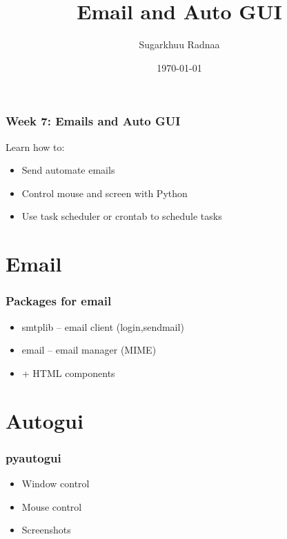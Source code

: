 \documentclass{beamer}
\title[Introduction to Python]{Email and Auto GUI}
\author{Sugarkhuu Radnaa}
\institute[]
{
Py4Econ in Ulaanbaatar \\ 
\medskip
\textit{py4econ@gmail.com} 
}
\date{\today}  %
\begin{document}
\begin{frame}
\titlepage %
\end{frame}

\begin{frame}
    \frametitle{Week 7: Emails and Auto GUI}
    Learn how to:
    \begin{itemize}
        \item Send automate emails
        \item Control mouse and screen with Python
        \item Use task scheduler or crontab to schedule tasks
    \end{itemize}
\end{frame}

\section{Email} 

\begin{frame}
    \frametitle{Packages for email}
            \begin{itemize}
                \item smtplib – email client (login,sendmail)
                \item email – email manager (MIME)
                \item + HTML components
            \end{itemize}
\end{frame}

\section{Autogui} 

\begin{frame}
    \frametitle{pyautogui}
            \begin{itemize}
                \item Window control
                \item Mouse control
                \item Screenshots
            \end{itemize}
\end{frame}

\end{document}
